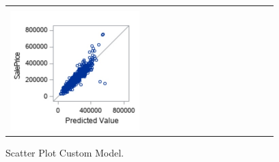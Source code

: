 \documentclass[11pt]{scrartcl} %
\begin{document}
\begin{figure}[H] %
	\centering
	\begin{tabular}{| p{}|}
	\hline
	\\
	\includegraphics[width=0.50\textwidth]{../graphics/A2Custscatt}\\
	\hline
	\end{tabular}	
	\caption{Scatter Plot Custom Model.} %
	\label{fig:A2Customscatt}
\end{figure}
\end{document}
